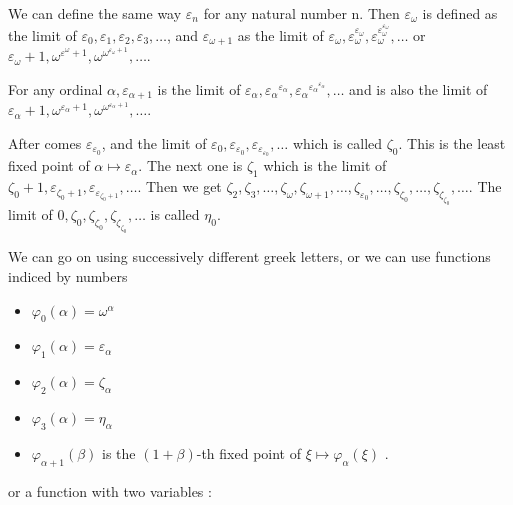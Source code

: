 \documentclass[10pt]{article}
\begin{document}
We can define the same way \( \varepsilon_n \) for any natural number n. Then \( \varepsilon_\omega \) is defined as the limit of \( \varepsilon_0, \varepsilon_1, \varepsilon_2, \varepsilon_3, \ldots \), and \( \varepsilon_{\omega+1} \) as the limit of \( \varepsilon_\omega, \varepsilon_\omega^{\varepsilon_\omega}, \varepsilon_\omega^{\varepsilon_\omega^{\varepsilon_\omega}}, \ldots \) or \( \varepsilon_\omega+1, \omega^{\varepsilon^\omega+1}, \omega^{\omega^{\varepsilon_\omega+1}}, \ldots \).

For any ordinal \( \alpha, \varepsilon_{\alpha+1} \) is the limit of \( \varepsilon_\alpha, {\varepsilon_\alpha}^{\varepsilon_\alpha}, {\varepsilon_\alpha}^{{\varepsilon_\alpha}^{\varepsilon_\alpha}}, \ldots \) and is also the limit of \( \varepsilon_\alpha+1, \omega^{\varepsilon_\alpha+1}, \omega^{\omega^{\varepsilon_\alpha+1}}, \ldots \).

After comes \( \varepsilon_{\varepsilon_0} \), and the limit of \( \varepsilon_0, \varepsilon_{\varepsilon_0}, \varepsilon_{\varepsilon_{\varepsilon_0}}, \ldots \) which is called \( \zeta_0 \). 
This is the least fixed point of \( \alpha \mapsto \varepsilon_\alpha \). The next one is \( \zeta_1 \) which is the limit of \( \zeta_0+1, \varepsilon_{\zeta_0+1}, \varepsilon_{\varepsilon_{\zeta_0+1}}, \ldots \). 
Then we get \( \zeta_2, \zeta_3, \ldots, \zeta_\omega, \zeta_{\omega+1}, \ldots, \zeta_{\varepsilon_0}, \ldots, \zeta_{\zeta_0}, \ldots, \zeta_{\zeta_{\zeta_0}}, \ldots \).
The limit of \( 0, \zeta_0, \zeta_{\zeta_0}, \zeta_{\zeta_{\zeta_0}}, \ldots \) is called \( \eta_0 \). 

We can go on using successively different greek letters, or we can use functions indiced by numbers

\begin{itemize}
     \setlength{\itemsep}{1pt}
     \setlength{\parskip}{0pt}
     \setlength{\parsep}{0pt}
\item \( \varphi_0(\alpha) = \omega^\alpha \)
\item \( \varphi_1(\alpha) = \varepsilon_\alpha \)
\item \( \varphi_2(\alpha) = \zeta_\alpha \)
\item \( \varphi_3(\alpha) = \eta_\alpha \)
\item \( \varphi_{\alpha+1}(\beta) \) is the \( (1+\beta) \)-th fixed point of \( \xi \mapsto \varphi_\alpha(\xi) \) .
\end{itemize}

or a function with two variables : 
\end{document}
